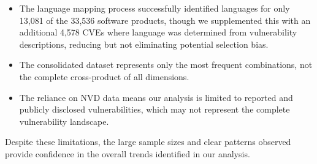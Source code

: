 \begin{itemize}
    \item The language mapping process successfully identified languages for only 13,081 of the 33,536 software products, though we supplemented this with an additional 4,578 CVEs where language was determined from vulnerability descriptions, reducing but not eliminating potential selection bias.
    \item The consolidated dataset represents only the most frequent combinations, not the complete cross-product of all dimensions.
    \item The reliance on NVD data means our analysis is limited to reported and publicly disclosed vulnerabilities, which may not represent the complete vulnerability landscape.
\end{itemize}

Despite these limitations, the large sample sizes and clear patterns observed provide confidence in the overall trends identified in our analysis.
